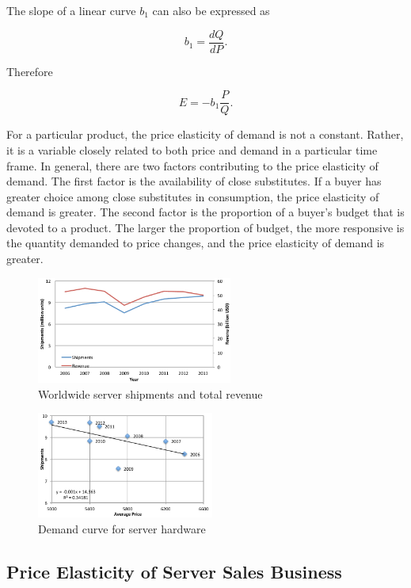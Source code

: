 \documentclass[10pt,journal,cspaper,compsoc]{IEEEtran}
\begin{document}
The slope of a linear curve $b_1$ can also be expressed as

\begin{equation}
b_1 = \frac{dQ}{dP} .
\end{equation}

Therefore

\begin{equation}
\label{eq:elasticity}
E = - b_1  \frac{P}{Q} .
\end{equation}

For a particular product, the price elasticity of demand is not a constant. Rather, it is a variable closely related to both price and demand in a particular time frame. In general, there are two factors contributing to the price elasticity of demand. The first factor is the availability of close substitutes. If a buyer has greater choice among close substitutes in consumption, the price elasticity of demand is greater. The second factor is the proportion of a buyer's budget that is devoted to a product. The larger the proportion of budget, the more responsive is the quantity demanded to price changes, and the price elasticity of demand is greater.

\begin{figure}[t!]
\centering
\includegraphics[height=3.5cm]{fig02}
\caption{Worldwide server shipments and total revenue}
\label{fig:shipmentsNrevenue}
\end{figure}

\begin{figure}[t!]
\centering
\includegraphics[height=3.5cm]{fig03}
\caption{Demand curve for server hardware}
\label{fig:shipmentsNunitprice}
\end{figure}


\subsection{Price Elasticity of Server Sales Business}
\label{sec:priceServerSales}
\end{document}
